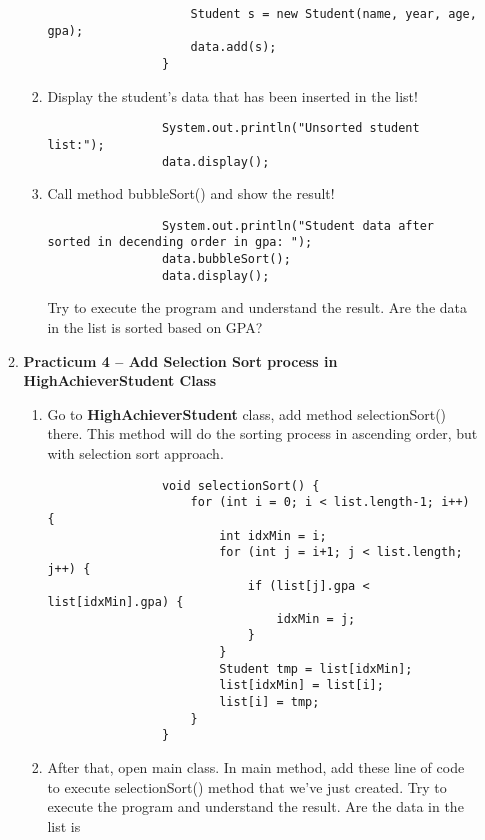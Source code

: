 \documentclass[12pt,titlepage]{article}
\begin{document}
\begin{enumerate}
\begin{enumerate}[label=\textbf{\alph*.}]
\begin{enumerate}[label=\arabic*.]
\begin{verbatim}
                    Student s = new Student(name, year, age, gpa);
                    data.add(s);
                }
            \end{verbatim}
            \item Display the student’s data that has been inserted in the list!
            \begin{verbatim}
                System.out.println("Unsorted student list:");
                data.display();
            \end{verbatim}
            \item Call method bubbleSort() and show the result!
            \begin{verbatim}
                System.out.println("Student data after sorted in decending order in gpa: ");
                data.bubbleSort();
                data.display();
            \end{verbatim}
            Try to execute the program and understand the result. Are the data in the list is sorted based on GPA?
        \end{enumerate}
        \item \textbf{Practicum 4 – Add Selection Sort process in HighAchieverStudent Class}
        \begin{enumerate}[label=\arabic*.]
            \item Go to \textbf{HighAchieverStudent} class, add method selectionSort() there. This method will do the sorting process in ascending order, but with selection sort approach.
            \begin{verbatim}
                void selectionSort() {
                    for (int i = 0; i < list.length-1; i++) {
                        int idxMin = i;
                        for (int j = i+1; j < list.length; j++) {
                            if (list[j].gpa < list[idxMin].gpa) {
                                idxMin = j;
                            }
                        }
                        Student tmp = list[idxMin];
                        list[idxMin] = list[i];
                        list[i] = tmp;
                    }
                }
            \end{verbatim}
            \item After that, open main class. In main method, add these line of code to execute selectionSort() method that we’ve just created. Try to execute the program and understand the result. Are the data in the list is
            \begin{verbatim}

\end{verbatim}
\end{enumerate}
\end{enumerate}
\end{enumerate}
\end{document}
